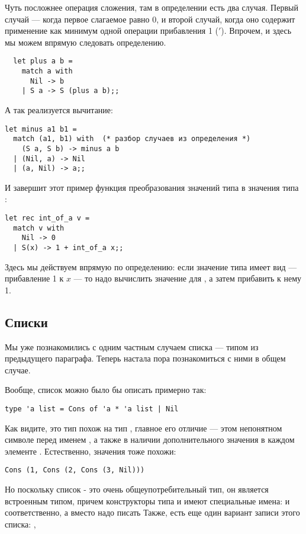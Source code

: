 Чуть посложнее операция сложения, там в определении есть два случая.
Первый случай --- когда первое слагаемое равно 0, и второй случай, когда
оно содержит применение как минимум одной операции прибавления 1 ($'$). 
Впрочем, и здесь мы можем впрямую следовать определению.
\begin{verbatim}
  let plus a b = 
    match a with
      Nil -> b
    | S a -> S (plus a b);;
\end{verbatim}

А так реализуется вычитание:
\begin{verbatim}
let minus a1 b1 = 
  match (a1, b1) with  (* разбор случаев из определения *)
    (S a, S b) -> minus a b
  | (Nil, a) -> Nil
  | (a, Nil) -> a;;
\end{verbatim}

И завершит этот пример функция преобразования значений типа  в 
значения типа :

\begin{verbatim}
let rec int_of_a v =
  match v with
    Nil -> 0
  | S(x) -> 1 + int_of_a x;;
\end{verbatim}

Здесь мы действуем впрямую по определению: если значение типа 
имеет вид  --- прибавление 1 к $x$ --- то надо вычислить значение
для , а затем прибавить к нему 1.

\subsection{Списки}

Мы уже познакомились с одним частным случаем списка --- типом  из 
предыдущего
параграфа. Теперь настала пора познакомиться с ними в общем случае.

Вообще, список можно было бы описать примерно так:
\begin{verbatim}
type 'a list = Cons of 'a * 'a list | Nil
\end{verbatim}

Как видите, это тип похож на тип , главное его отличие --- этом
непонятном символе  перед именем , а также в наличии 
дополнительного значения в каждом элементе .
Естественно, значения тоже похожи:
\begin{verbatim}
Cons (1, Cons (2, Cons (3, Nil)))
\end{verbatim}

Но поскольку список - это очень общеупотребительный тип, он является 
встроенным типом, причем конструкторы типа  и  имеют специальные
имена: \s{::} и \s{[]} соответственно, а вместо 
надо писать 
Также, есть еще один вариант записи этого списка:
\s{[1;2;3]}, 

